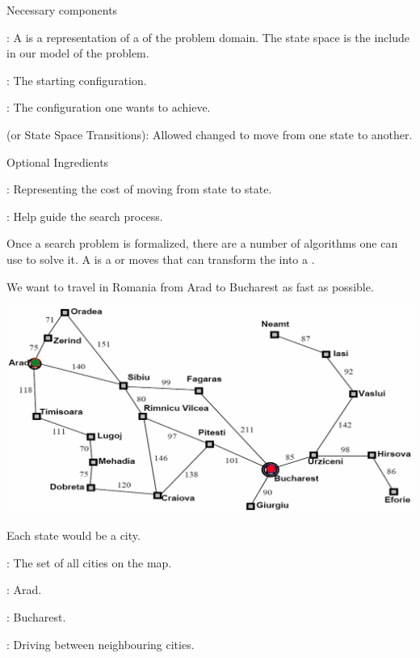 \begin{listu}
    \item Necessary components

    \begin{listo}
        \item {}: A  is a representation of a  of the problem domain. The state space is the  include in our model of the problem.
        \item {}: The starting configuration.
        \item {}: The configuration one wants to achieve.
        \item {} (or State Space Transitions): Allowed changed to move from one state to another.
    \end{listo}

    \item Optional Ingredients

    \begin{listu}
        \item {}: Representing the cost of moving from state to state.
        \item {}: Help guide the search process.
    \end{listu}
\end{listu}

Once a search problem is formalized, there are a number of algorithms one can use to solve it. A  is a  or moves that can transform the  into a .

\begin{example}
    We want to travel in Romania from Arad to Bucharest as fast as possible.

    \begin{center}
        \includegraphics[width=0.75\linewidth]{figures/Romania Travel.png}
    \end{center}

    Each state would be a city.

    \begin{listu}
        \item {}: The set of all cities on the map.
        \item {}: Arad.
        \item {}: Bucharest.
        \item {}: Driving between neighbouring cities.
    \end{listu}
\end{example}


